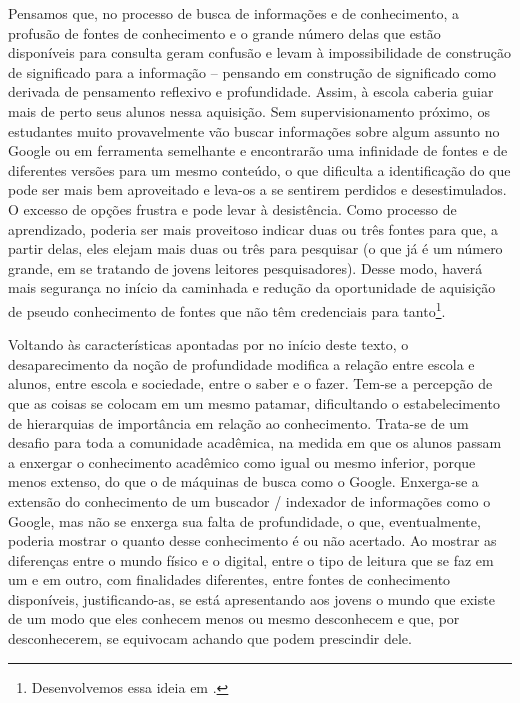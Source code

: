 Pensamos que, no processo de busca de informações e de conhecimento, a profusão de fontes de conhecimento e o grande número delas que estão disponíveis para consulta geram confusão e levam à impossibilidade de construção de significado para a informação – pensando em construção de significado como derivada de pensamento reflexivo e profundidade. Assim, à escola caberia guiar mais de perto seus alunos nessa aquisição. Sem supervisionamento próximo, os estudantes muito provavelmente vão buscar informações sobre algum assunto no Google ou em ferramenta semelhante e encontrarão uma infinidade de fontes e de diferentes versões para um mesmo conteúdo, o que dificulta a identificação do que pode ser mais bem aproveitado e leva-os a se sentirem perdidos e desestimulados. O excesso de opções frustra e pode levar à desistência. Como processo de aprendizado, poderia ser mais proveitoso indicar duas ou três fontes para que, a partir delas, eles elejam mais duas ou três para pesquisar (o que já é um número grande, em se tratando de jovens leitores pesquisadores). Desse modo, haverá mais segurança no início da caminhada e redução da oportunidade de aquisição de pseudo conhecimento de fontes que não têm credenciais para tanto\footnote{Desenvolvemos essa ideia em \textcite{noronha2019}.}. 

Voltando às características apontadas por \textcite{lash2012} no início deste texto, o desaparecimento da noção de profundidade modifica a relação entre escola e alunos, entre escola e sociedade, entre o saber e o fazer. Tem-se a percepção de que as coisas se colocam em um mesmo patamar, dificultando o estabelecimento de hierarquias de importância em relação ao conhecimento. Trata-se de um desafio para toda a comunidade acadêmica, na medida em que os alunos passam a enxergar o conhecimento acadêmico como igual ou mesmo inferior, porque menos extenso, do que o de máquinas de busca como o Google. Enxerga-se a extensão do conhecimento de um buscador / indexador de informações como o Google, mas não se enxerga sua falta de profundidade, o que, eventualmente, poderia mostrar o quanto desse conhecimento é ou não acertado. Ao mostrar as diferenças entre o mundo físico e o digital, entre o tipo de leitura que se faz em um e em outro, com finalidades diferentes, entre fontes de conhecimento disponíveis, justificando-as, se está apresentando aos jovens o mundo que existe de um modo que eles conhecem menos ou mesmo desconhecem e que, por desconhecerem, se equivocam achando que podem prescindir dele. 